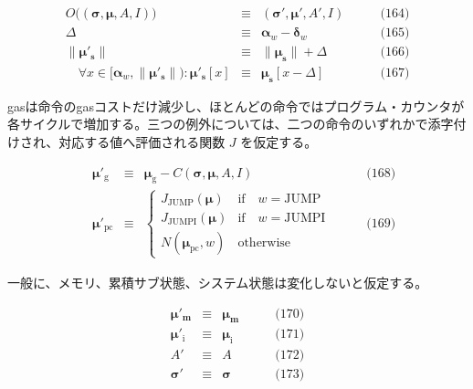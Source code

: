 \documentclass[
]{ltjsarticle}
\begin{document}
\[\begin{aligned}
O\big((\boldsymbol{\sigma}, \boldsymbol{\mu}, A, I)\big) & \equiv & (\boldsymbol{\sigma}', \boldsymbol{\mu}', A', I) & \qquad \text{(164)} \\
\Delta & \equiv & \mathbf{\alpha}_{w} - \mathbf{\delta}_{w} & \qquad \text{(165)} \\
\lVert\boldsymbol{\mu}'_{\mathbf{s}}\rVert & \equiv & \lVert\boldsymbol{\mu}_{\mathbf{s}}\rVert + \Delta & \qquad \text{(166)} \\
\quad \forall x \in [\mathbf{\alpha}_{w}, \lVert\boldsymbol{\mu}'_{\mathbf{s}}\rVert): \boldsymbol{\mu}'_{\mathbf{s}}[x] & \equiv & \boldsymbol{\mu}_{\mathbf{s}}[x-\Delta] & \qquad \text{(167)}
\end{aligned}\]

gasは命令のgasコストだけ減少し、ほとんどの命令ではプログラム・カウンタが各サイクルで増加する。三つの例外については、二つの命令のいずれかで添字付けされ、対応する値へ評価される関数
\(J\) を仮定する。

\protect\hypertarget{eq-168}{}{}\protect\hypertarget{eq-169}{}{}\protect\hypertarget{eq:mu_pc}{}{}

\[\begin{aligned}
\quad \boldsymbol{\mu}'_{\mathrm{g}} & \equiv & \boldsymbol{\mu}_{\mathrm{g}} - C(\boldsymbol{\sigma}, \boldsymbol{\mu}, A, I) & \qquad \text{(168)} \\
\quad \boldsymbol{\mu}'_{\mathrm{pc}} & \equiv & \begin{cases}
J_{\text{JUMP}}(\boldsymbol{\mu}) & \text{if} \quad w = \text{JUMP} \\
J_{\text{JUMPI}}(\boldsymbol{\mu}) & \text{if} \quad w = \text{JUMPI} \\
N(\boldsymbol{\mu}_{\mathrm{pc}}, w) & \text{otherwise}
\end{cases} & \qquad \text{(169)}
\end{aligned}\]

一般に、メモリ、累積サブ状態、システム状態は変化しないと仮定する。

\protect\hypertarget{eq-170}{}{}\protect\hypertarget{eq-171}{}{}\protect\hypertarget{eq-172}{}{}\protect\hypertarget{eq-173}{}{}

\[\begin{aligned}
\boldsymbol{\mu}'_{\mathbf{m}} & \equiv & \boldsymbol{\mu}_{\mathbf{m}} & \qquad \text{(170)} \\
\boldsymbol{\mu}'_{\mathrm{i}} & \equiv & \boldsymbol{\mu}_{\mathrm{i}} & \qquad \text{(171)} \\
A' & \equiv & A & \qquad \text{(172)} \\
\boldsymbol{\sigma}' & \equiv & \boldsymbol{\sigma} & \qquad \text{(173)}
\end{aligned}\]
\end{document}

